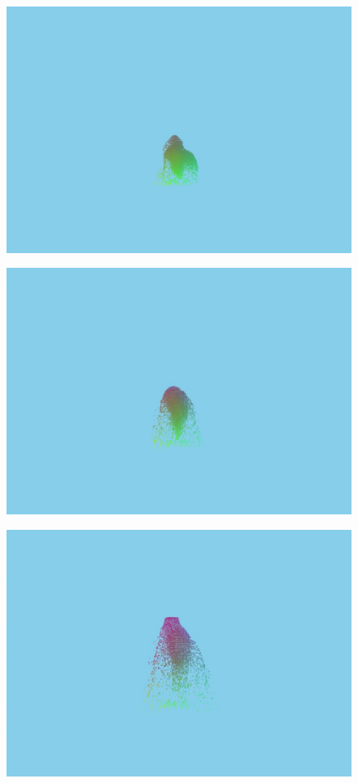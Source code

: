 \documentclass[intern,palatino]{cgBA}
\begin{document}
\begin{figure}[H]
	\centering
	\includegraphics[width=1\columnwidth]{Bilder/1.jpg}
\end{figure}
\begin{figure}[H]
	\centering
	\includegraphics[width=1\columnwidth]{Bilder/2.jpg}
\end{figure}
\begin{figure}[H]
	\centering
	\includegraphics[width=1\columnwidth]{Bilder/3.jpg}
\end{figure}
\end{document}

